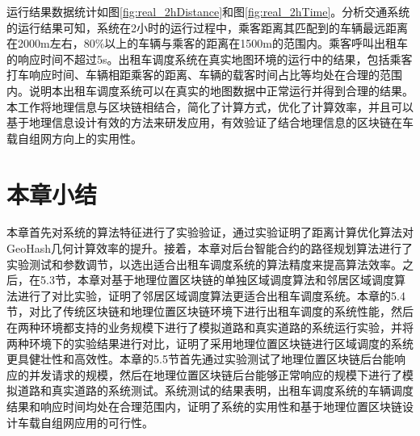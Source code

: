 运行结果数据统计如图\ref{fig:real_2hDistance}和图\ref{fig:real_2hTime}。分析交通系统的运行结果可知，系统在2小时的运行过程中，乘客距离其匹配到的车辆最远距离在2000m左右，80$\%$以上的车辆与乘客的距离在1500m的范围内。乘客呼叫出租车的响应时间不超过5s。出租车调度系统在真实地图环境的运行中的结果，包括乘客打车响应时间、车辆相距乘客的距离、车辆的载客时间占比等均处在合理的范围内。说明本出租车调度系统可以在真实的地图数据中正常运行并得到合理的结果。本工作将地理信息与区块链相结合，简化了计算方式，优化了计算效率，并且可以基于地理信息设计有效的方法来研发应用，有效验证了结合地理信息的区块链在车载自组网方向上的实用性。

\section{本章小结}
本章首先对系统的算法特征进行了实验验证，通过实验证明了距离计算优化算法对GeoHash几何计算效率的提升。接着，本章对后台智能合约的路径规划算法进行了实验测试和参数调节，以选出适合出租车调度系统的算法精度来提高算法效率。之后，在5.3节，本章对基于地理位置区块链的单独区域调度算法和邻居区域调度算法进行了对比实验，证明了邻居区域调度算法更适合出租车调度系统。本章的5.4节，对比了传统区块链和地理位置区块链环境下进行出租车调度的系统性能，然后在两种环境都支持的业务规模下进行了模拟道路和真实道路的系统运行实验，并将两种环境下的实验结果进行对比，证明了采用地理位置区块链进行区域调度的系统更具健壮性和高效性。本章的5.5节首先通过实验测试了地理位置区块链后台能响应的并发请求的规模，然后在地理位置区块链后台能够正常响应的规模下进行了模拟道路和真实道路的系统测试。系统测试的结果表明，出租车调度系统的车辆调度结果和响应时间均处在合理范围内，证明了系统的实用性和基于地理位置区块链设计车载自组网应用的可行性。

